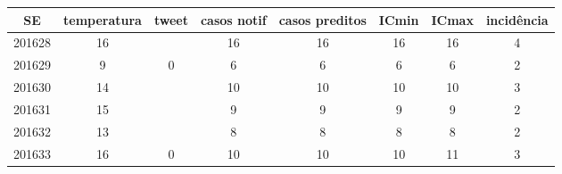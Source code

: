 \begin{tabular}{c|ccccccc}
  \hline
SE & temperatura & tweet & casos notif & casos preditos & ICmin & ICmax & incidência \\ 
  \hline
201628 & 16 &  & 16 & 16 & 16 & 16 & 4 \\ 
  201629 & 9 & 0 & 6 & 6 & 6 & 6 & 2 \\ 
  201630 & 14 &  & 10 & 10 & 10 & 10 & 3 \\ 
  201631 & 15 &  & 9 & 9 & 9 & 9 & 2 \\ 
  201632 & 13 &  & 8 & 8 & 8 & 8 & 2 \\ 
  201633 & 16 & 0 & 10 & 10 & 10 & 11 & 3 \\ 
   \hline
\end{tabular}
